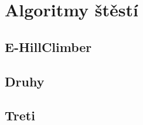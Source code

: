 \section{Algoritmy štěstí}

\subsection{E-HillClimber}

\subsection{Druhy}

\subsection{Treti}

\endinput
